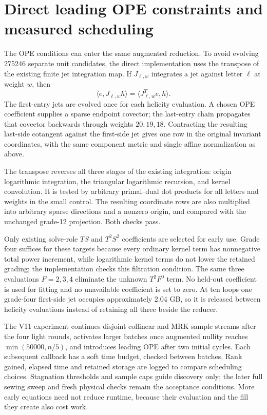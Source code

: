 \documentclass[11pt]{article}
\begin{document}
\section{Direct leading OPE constraints and measured scheduling}
The OPE conditions can enter the same augmented reduction. To avoid evolving
275246 separate unit candidates, the direct implementation uses the
transpose of the existing finite jet integration map. If $J_{\ell,w}$
integrates a jet against letter $\ell$ at weight $w$, then
\begin{equation}
 \langle e,J_{\ell,w}h\rangle
 =\langle J_{\ell,w}^{T}e,h\rangle.
\end{equation}
The first-entry jets are evolved once for each helicity evaluation. A chosen
OPE coefficient supplies a sparse endpoint covector; the last-entry chain
propagates that covector backwards through weights $20,19,18$. Contracting
the resulting last-side cotangent against the first-side jet gives one row
in the original invariant coordinates, with the same component metric and
single affine normalization as above.

The transpose reverses all three stages of the existing integration:
origin logarithmic integration, the triangular logarithmic recursion, and
kernel convolution. It is tested by arbitrary primal--dual dot products for
all letters and weights in the small control. The resulting coordinate rows
are also multiplied into arbitrary sparse directions and a nonzero origin,
and compared with the unchanged grade-12 projection. Both checks pass.

Only existing solve-role $T S$ and $T^2 S^2$ coefficients are selected for
early use. Grade four suffices for these targets because every ordinary
kernel term has nonnegative total power increment, while logarithmic
kernel terms do not lower the retained grading; the implementation checks
this filtration condition. The same three evaluations $F=2,3,4$ eliminate
the unknown $T^2F^0$ term. No held-out coefficient is used for fitting and
no unavailable coefficient is set to zero. At ten loops one grade-four
first-side jet occupies approximately 2.04 GB, so it is released between
helicity evaluations instead of retaining all three beside the reducer.

The V11 experiment continues disjoint collinear and MRK sample streams
after the four light rounds, activates larger batches once augmented
nullity reaches $\min(50000,n/5)$, and introduces leading OPE after two
initial cycles. Each subsequent callback has a soft time budget, checked
between batches. Rank gained, elapsed time and retained storage are logged
to compare scheduling choices. Stagnation thresholds and sample caps guide
discovery only; the later full sewing sweep and fresh physical checks
remain the acceptance conditions. More early equations need not reduce
runtime, because their evaluation and the fill they create also cost work.
\end{document}
